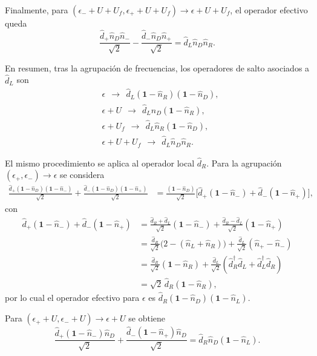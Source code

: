 \begin{appendixs}
Finalmente, para \((\epsilon_{-}+U+U_{f},\epsilon_{+}+U+U_{f})\to \epsilon+U+U_{f}\), el operador efectivo queda
\[
\frac{\hat{d}_{+}\hat{n}_{D}\hat{n}_{-}}{\sqrt{2}}
-\frac{\hat{d}_{-}\hat{n}_{D}\hat{n}_{+}}{\sqrt{2}}
=\hat{d}_{L}\hat{n}_{D}\hat{n}_{R}.
\]

En resumen, tras la agrupación de frecuencias, los operadores de salto asociados a \(\hat{d}_{L}\) son
\begin{align*}
&\epsilon \ \ \to\ \ \hat{d}_{L}(\mathbf{1}-\hat{n}_{R})(\mathbf{1}-\hat{n}_{D}),\\
&\epsilon+U \ \ \to\ \ \hat{d}_{L}\hat{n}_{D}(\mathbf{1}-\hat{n}_{R}),\\
&\epsilon+U_{f} \ \ \to\ \ \hat{d}_{L}\hat{n}_{R}(\mathbf{1}-\hat{n}_{D}),\\
&\epsilon+U+U_{f} \ \ \to\ \ \hat{d}_{L}\hat{n}_{D}\hat{n}_{R}.
\end{align*}

El mismo procedimiento se aplica al operador local \(\hat{d}_{R}\). Para la agrupación \((\epsilon_{+},\epsilon_{-})\to \epsilon\) se considera
\begin{align*}
\frac{\hat{d}_{+}(\mathbf{1}-\hat{n}_{D})(\mathbf{1}-\hat{n}_{-})}{\sqrt{2}}
+\frac{\hat{d}_{-}(\mathbf{1}-\hat{n}_{D})(\mathbf{1}-\hat{n}_{+})}{\sqrt{2}}
&=\frac{(\mathbf{1}-\hat{n}_{D})}{\sqrt{2}}\big[\hat{d}_{+}(\mathbf{1}-\hat{n}_{-})
+\hat{d}_{-}(\mathbf{1}-\hat{n}_{+})\big],
\end{align*}
con
\begin{align*}
\hat{d}_{+}(\mathbf{1}-\hat{n}_{-})+\hat{d}_{-}(\mathbf{1}-\hat{n}_{+})
&=\frac{\hat{d}_{R}+\hat{d}_{L}}{\sqrt{2}}(\mathbf{1}-\hat{n}_{-})
+\frac{\hat{d}_{R}-\hat{d}_{L}}{\sqrt{2}}(\mathbf{1}-\hat{n}_{+})\\
&=\frac{\hat{d}_{R}}{\sqrt{2}}\big(2-(\hat{n}_{L}+\hat{n}_{R})\big)
+\frac{\hat{d}_{L}}{\sqrt{2}}(\hat{n}_{+}-\hat{n}_{-})\\
&=\frac{\hat{d}_{R}}{\sqrt{2}}(\mathbf{1}-\hat{n}_{R})
+\frac{\hat{d}_{L}}{\sqrt{2}}(\hat{d}^{\dagger}_{R}\hat{d}_{L}+\hat{d}^{\dagger}_{L}\hat{d}_{R})\\
&=\sqrt{2}\,\hat{d}_{R}(\mathbf{1}-\hat{n}_{R}),
\end{align*}
por lo cual el operador efectivo para \(\epsilon\) es
\(\hat{d}_{R}(\mathbf{1}-\hat{n}_{D})(\mathbf{1}-\hat{n}_{L})\).

Para \((\epsilon_{+}+U,\epsilon_{-}+U)\to \epsilon+U\) se obtiene
\[
\frac{\hat{d}_{+}(\mathbf{1}-\hat{n}_{-})\hat{n}_{D}}{\sqrt{2}}
+\frac{\hat{d}_{-}(\mathbf{1}-\hat{n}_{+})\hat{n}_{D}}{\sqrt{2}}
=\hat{d}_{R}\hat{n}_{D}(\mathbf{1}-\hat{n}_{L}).
\]


\end{appendixs}

